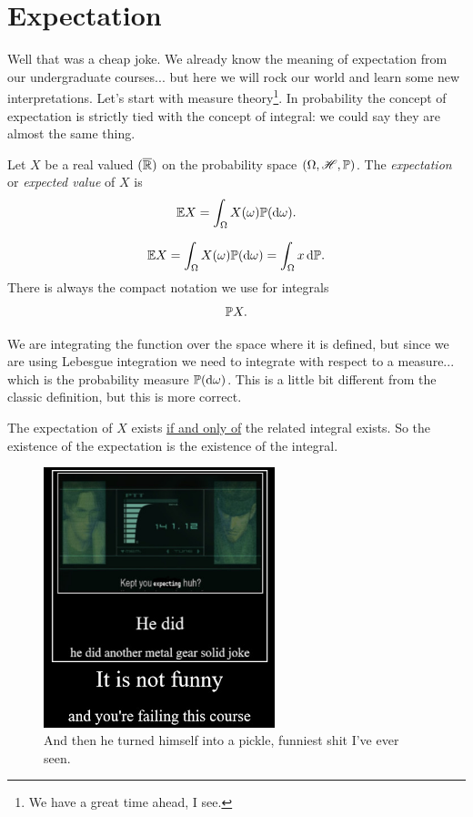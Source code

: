\documentclass{report}
\begin{document}
\section{Expectation}
Well that was a cheap joke. We already know the meaning of expectation from our undergraduate courses... but here we will rock our world and learn some new interpretations. Let's start with measure theory\footnote{We have a great time ahead, I see.}. In probability the concept of expectation is strictly tied with the concept of integral: we could say they are almost the same thing.
\begin{definition}
	Let $X$ be a real valued $(\overline{\mathbb{R}})$ \rv{} on the probability space $(\Omega,\mathscr{H},\mathbb{P})$. The \emph{expectation} or \emph{expected value} of $X$ is
	\[\mathbb{E} X=\int_\Omega X(\omega)\mathbb{P}(\mathop{}\!\mathrm{d}\omega).\]
\end{definition}
	\begin{notation}
		\[\mathbb{E} X=\int_\Omega X(\omega)\mathbb{P}(\mathop{}\!\mathrm{d}\omega)=\int_\Omega x\mathop{}\!\mathrm{d}\mathbb{P}.\]
		There is always the compact notation we use for integrals
		\[\mathbb{P} X.\]
	\end{notation}
We are integrating the function over the space where it is defined, but since we are using Lebesgue integration we need to integrate with respect to a measure... which is the probability measure $\mathbb{P}(\mathop{}\!\mathrm{d}\omega)$. This is a little bit different from the classic definition, but this is more correct.
\begin{remark}
	The expectation of $X$ exists \underline{if and only of} the related integral exists. So the existence of the expectation is the existence of the integral.\\
\end{remark}
\begin{figure}
	\centering
	\includegraphics[width=0.6\textwidth]{kept3}
	\caption{And then he turned himself into a pickle, funniest shit I've ever seen.}
	\label{fig:kept3}
\end{figure}
\end{document}
